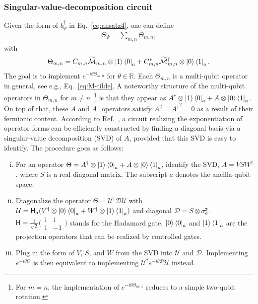 \documentclass[a4paper,onecolumn,11pt,accepted=2024-10-11]{quantumarticle}
\begin{document}
\subsubsection{Singular-value-decomposition circuit}
\label{sec:3-3}
Given the form of $b_\Psi^\dagger$ in Eq.~\eqref{eq:ansatz4}, one can define
%
\begin{align}
\Theta_\Psi=\sum_{m,n}\Theta_{m,n},
\end{align}
%
with
%
\begin{align}
\Theta_{m,n} =  C_{m,n}\widetilde{\mathcal{M}}_{m,n} \otimes \ket{1}\bra{0}_{a} +  C_{m,n}^*\widetilde{\mathcal{M}}_{m,n}^\dagger \otimes \ket{0}\bra{1}_{a}.
\label{eq:Theta-m-n}
\end{align}
%
The goal is to implement $e^{-i\theta \Theta_{m,n}}$ for $\theta \in \mathbb{R}$. Each $\Theta_{m,n}$ is a multi-qubit operator in general, see e.g., Eq.~\eqref{eq:M-tilde}. A noteworthy structure of the multi-qubit operators in $\Theta_{m,n}$ for $m \neq n$~\footnote{For $m=n$, the implementation of $e^{-i\theta\Theta_{m,n}}$ reduces to a simple two-qubit rotation.} is that they appear as $A^{\dagger} \otimes\ket{1}\bra{0}_a+ A\otimes\ket{0}\bra{1}_a$.
On top of that, these $A$ and $A^\dagger$ operators satisfy $A^2 = {A^\dagger}^2 = 0$ as a result of their fermionic content. According to Ref.~\cite{Davoudi:2022xmb}, a circuit realizing the exponentiation of operator forms can be efficiently constructed by finding a diagonal basis via a singular-value decomposition (SVD) of $A$, provided that this SVD is easy to identify. The procedure goes as follows:
%
\begin{enumerate}[i)]
    \item For an operator $\Theta = A^{\dagger} \otimes \ket{1}\bra{0}_a + A \otimes \ket{0}\bra{1}_a$, identify the SVD, $A = VSW^\dagger$, where $S$ is a real diagonal matrix. The subscript $a$ denotes the ancilla-qubit space. 
%
    \item Diagonalize the operator $\Theta = \mathcal{U}^\dagger \mathcal{D} \mathcal{U}$ with $\mathcal{U} = \mathsf{H}_a( V^\dagger \otimes {\ket{0}\bra{0}}_a + W^\dagger \otimes {\ket{1}\bra{1}}_a) $ and diagonal $\mathcal{D} = S \otimes \sigma^\textbf{z}_a$. $\mathsf{H}=\frac{1}{\sqrt{2}}\big(\begin{smallmatrix}
    1 & 1\\
    1 & -1
    \end{smallmatrix}\big)$ stands for the Hadamard gate. ${\ket{0}\bra{0}}_a$ and ${\ket{1}\bra{1}}_a$ are the projection operators that can be realized by controlled gates.  
%
    \item Plug in the form of $V$, $S$, and $W$ from the SVD into $\mathcal{U}$ and $\mathcal{D}$. Implementing $e^{-i\theta\Theta}$ is then equivalent to implementing $\mathcal{U}^{\dagger} e^{-i\theta\mathcal{D}} \mathcal{U}$ instead.
\end{enumerate}
\end{document}
